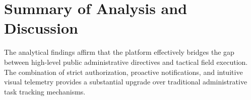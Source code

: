 \section{Summary of Analysis and Discussion}
\label{sec:ana_summary}
The analytical findings affirm that the platform effectively bridges the gap between high-level public administrative directives and tactical field execution. The combination of strict authorization, proactive notifications, and intuitive visual telemetry provides a substantial upgrade over traditional administrative task tracking mechanisms.
